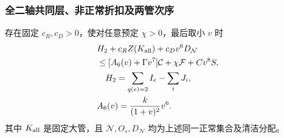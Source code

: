 \subsubsection{全二轴共同层、非正常折扣及两管次序}

\begin{lemma}[全部二轴联合价格]\label{eighth:joint-price}
存在固定 \(c_R,c_D>0\)，使对任意预定 \(\chi>0\)，最后取小 \(v\) 时
\begin{equation}\label{eighth:joint}
 \begin{aligned}
 &H_2+c_RZ(K_{\rm all})+c_Dv^6D_{\mathcal N}\\
 &\le[A_6(v)+\Gamma v^7]\mathcal C+\chi\mathcal F+Cv^8S,\\
 &\quad H_2=\sum_{q(e)=2}I_e-\sum_iJ_i,\quad\\
 &A_6(v)=\frac{k}{(1+v)^2}v^6 .
 \end{aligned}
\end{equation}
其中 \(K_{\rm all}\) 是固定大管，且 \(\mathcal N,O_s,D_{\mathcal N}\)
均为上述同一正常集合及清洁分配。
\end{lemma}
